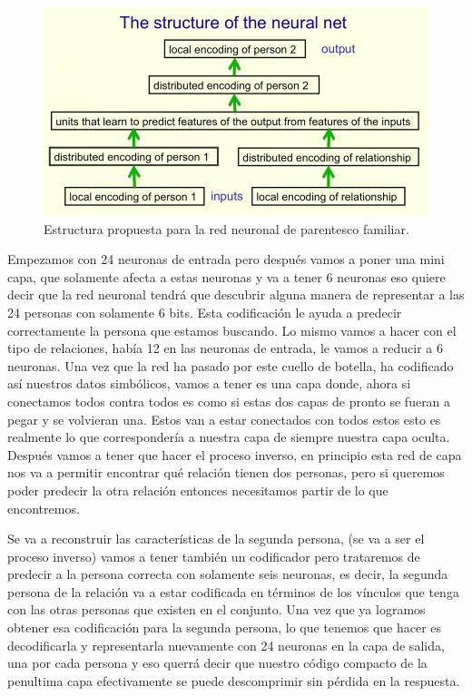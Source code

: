  
  \begin{figure}[h]
   \centering
   \includegraphics[scale=.5]{../Figuras/Hinton/RedHinton86.png}
   \caption{Estructura propuesta para la red neuronal de parentesco familiar.}
  \label{fig:RH86}
  \end{figure}

   Empezamos con 24 neuronas de entrada pero después vamos a poner una mini capa, que solamente afecta a estas neuronas y va a tener 6 neuronas eso quiere decir que la red neuronal tendrá que descubrir alguna manera de representar a las 24 personas con solamente 6 bits. Esta codificación le ayuda a predecir correctamente la persona que estamos buscando. Lo mismo vamos a hacer con el tipo de relaciones, había 12 en las neuronas de entrada, le vamos a reducir a 6 neuronas. Una vez que la red ha pasado por este cuello de botella, ha codificado así nuestros datos simbólicos, vamos a tener es una capa donde, ahora si conectamos todos contra todos es como si estas dos capas de pronto se fueran a pegar y se volvieran una. Estos van a estar conectados con todos estos esto es realmente lo que correspondería a nuestra capa de siempre nuestra capa oculta. Después vamos a tener que hacer el proceso inverso, en principio esta red de capa nos va a permitir encontrar  qué relación tienen dos personas, pero si queremos poder predecir la otra relación entonces necesitamos partir de lo que encontremos.
 
 Se va a reconstruir las características de la segunda persona, (se va a ser el proceso inverso) vamos a tener también un codificador pero  trataremos de predecir a la persona correcta con solamente seis neuronas, es decir, la segunda persona de la relación va a estar codificada en términos de los vínculos que tenga con las otras personas que existen en el conjunto. Una vez que ya logramos obtener esa codificación para la segunda persona, lo que tenemos que hacer es decodificarla y representarla nuevamente con 24 neuronas en la capa de salida, una por cada persona y eso querrá decir que nuestro código compacto de la penultima capa  efectivamente se puede descomprimir sin pérdida en la respuesta.

